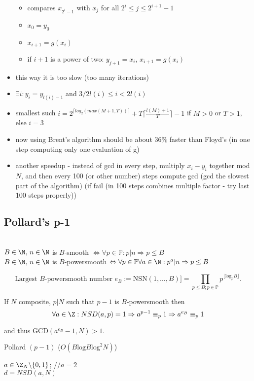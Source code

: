 \begin{itemize}
\begin{itemize}
		\item compares $x_{2^i-1}$ with $x_j$ for all $2^i\leq j \leq 2^{i+1}-1$
		\item $x_0 = y_0$
		\item $x_{i+1} = g(x_i)$
		\item if $i+1$ is a power of two: $y_{j+1} = x_{i}$, $x_{i+1} = g(x_i)$
	\end{itemize}
	\item this way it is too slow (too many iterations)
	\item $\exists i: y_i = y_{l(i)-1}$ and $3/2 l(i)\leq i < 2l(i)$
	\item smallest such $i = 2^{\lceil log_2(max(M+1,T))\rceil} + T\lceil\frac{l(M)+1}{T}\rceil-1$ if $M>0$ or $T>1$, else $i=3 $
	\item now using Brent's algorithm should be about $36\%$ faster than Floyd's (in one step computing only one evaluation of g)
	\item another speedup - instead of gcd in every step, multiply $x_i - y_i$ together mod $N$, and then every 100 (or other number) steps compute gcd (gcd the slowest part of the algorithm) (if fail (in 100 steps combines multiple factor - try last 100 steps properly))
\end{itemize}

\subsection*{Pollard's p-1}
\begin{defn}~\\
	$B\in\N,\,n\in\N$ is $B$-smooth $\Leftrightarrow \forall p\in\mathbb{P}:p|n\Rightarrow p\leq B$\\
	$B\in\N,\,n\in\N$ is $B$-powersmooth $\Leftrightarrow \forall p\in\mathbb{P}\forall a \in\N:p^a|n\Rightarrow p\leq B$\\
\end{defn}
\[
	\text{Largest $B$-powersmooth number }e_B:=\text{NSN}(1,\dots, B)]=\prod_{p\leq B;p\in\mathbb{P}}p^{\lfloor\text{log}_pB\rfloor}.
\]

If $N$ composite, $p|N$ such that $p-1$ is $B$-powersmooth then
\[
	\forall a \in\Z:NSD(a,p)=1 \Rightarrow a^{p-1}\equiv_p1 \Rightarrow a^{e_B}\equiv_p 1
\]

and thus GCD$(a^{e_B}-1,N)>1$.

\begin{algorithm}
    \caption{Pollard $(p-1)$ ($O(B\text{log}B\text{log}^2N)$)}
	$a\in\Z_N\backslash\{0,1\}$; //$a=2$\\
	$d=NSD(a,N)$\;
    \vspace{0.2cm}
\end{algorithm}

